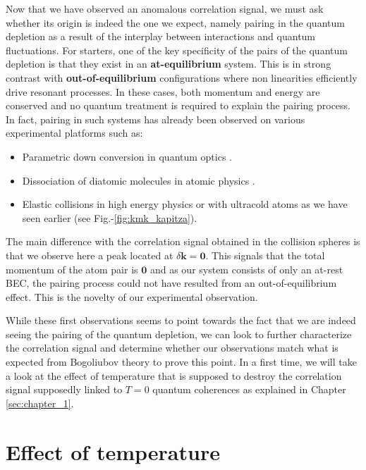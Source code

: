 Now that we have observed an anomalous correlation signal, we must ask whether its origin is indeed the one we expect, namely \kmk pairing in the quantum depletion as a result of the interplay between interactions and quantum fluctuations. For starters, one of the key specificity of the \kmk pairs of the quantum depletion is that they exist in an \textbf{at-equilibrium} system. This is in strong contrast with \textbf{out-of-equilibrium} configurations where non linearities efficiently drive resonant processes. In these cases, both momentum and energy are conserved and no quantum treatment is required to explain the pairing process. In fact, \kmk pairing in such systems has already been observed on various experimental platforms such as:

\begin{itemize}
    \item Parametric down conversion in quantum optics \cite{burnham1970}.
    \item Dissociation of diatomic molecules in atomic physics \cite{greiner2005}.
    \item Elastic collisions in high energy physics \cite{arnison1982} or with ultracold atoms \cite{perrin2007observation} as we have seen earlier (see Fig.-\ref{fig:kmk_kapitza}).
\end{itemize}

The main difference with the \kmk correlation signal obtained in the collision spheres is that we observe here a peak located at $\delta \bm{k} = \bm{0}$. This signals that the total momentum of the atom pair is $\bm{0}$ and as our system consists of only an at-rest BEC, the pairing process could not have resulted from an out-of-equilibrium effect. This is the novelty of our experimental observation.

While these first observations seems to point towards the fact that we are indeed seeing the \kmk pairing of the quantum depletion, we can look to further characterize the correlation signal and determine whether our observations match what is expected from Bogoliubov theory to prove this point. In a first time, we will take a look at the effect of temperature that is supposed to destroy the \kmk correlation signal supposedly linked to $T=0$ quantum coherences as explained in Chapter \ref{sec:chapter_1}.

\section{Effect of temperature}

